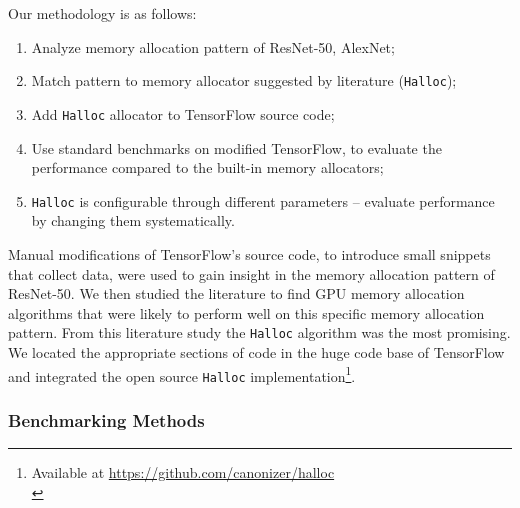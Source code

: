 \documentclass[12pt,twoside]{article}
\begin{document}
Our methodology is as follows:
\begin{enumerate}
    \vspace{-3px}
    \itemsep-0.25em
    \item Analyze memory allocation pattern of ResNet-50, AlexNet;
    \item Match pattern to memory allocator suggested by literature (\texttt{Halloc});
    \item Add \texttt{Halloc} allocator to TensorFlow source code;
    \item Use standard benchmarks on modified TensorFlow, to evaluate the performance compared to the built-in memory allocators;
    \item \texttt{Halloc} is configurable through different parameters -- evaluate performance by changing them systematically.
\vspace{-3px}
\end{enumerate}

Manual modifications of TensorFlow's source code, to introduce small snippets that collect data, were used to gain insight in the memory allocation pattern of ResNet-50. We then studied the literature to find GPU memory allocation algorithms that were likely to perform well on this specific memory allocation pattern. From this literature study the \texttt{Halloc} algorithm was the most promising. We located the appropriate sections of code in the huge code base of TensorFlow and integrated the open source \texttt{Halloc} implementation\footnote{Available at \url{https://github.com/canonizer/halloc}\\}.






\subsubsection*{Benchmarking Methods}
\end{document}
